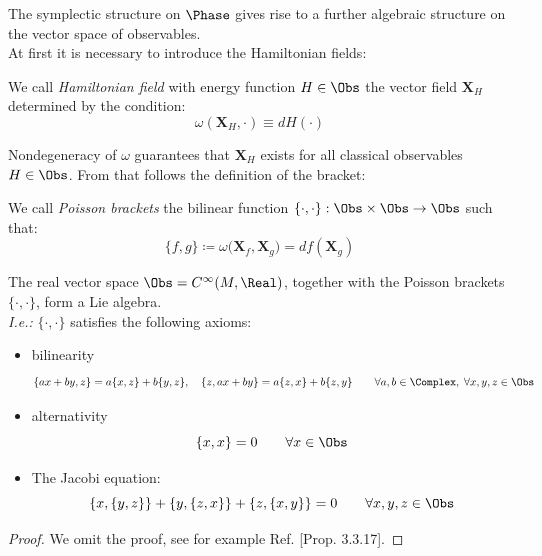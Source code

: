 \documentclass[Main]{subfiles}
\begin{document}
	\vspace{2mm}
	The symplectic structure on $\Phase$ gives rise to a further algebraic structure on the vector space of observables.\\
	At first it is necessary to introduce the Hamiltonian fields:
	\begin{definition}
		We call \emph{Hamiltonian field} with energy function $H\in \Obs$
		the vector field $\mathbf{X}_H$ determined by the condition:
		\begin{displaymath}
			\omega( \mathbf{X}_H,  \cdot )\equiv dH (\cdot)
		\end{displaymath}
	\end{definition}
	Nondegeneracy of $\omega$ guarantees that $\mathbf{X}_H$ exists for all classical observables $H\in \Obs$.
	From that follows the definition of the bracket:
	\begin{definition}
		We call \emph{Poisson brackets}
		the bilinear function 	$\{\cdot, \cdot\} : \Obs \times \Obs \rightarrow \Obs$ such that:
		\begin{equation}
			\{ f, g \} \coloneqq \omega \big( \mathbf{X}_f , \mathbf{X}_g \big) = df ( \mathbf{X}_g)
		\end{equation}
	\end{definition}
	\begin{proposition}
		The real vector space $\Obs= C^\infty(M,\Real)$, together with the Poisson brackets $\{\cdot, \cdot\}$, form a Lie algebra.\\
		\textit{I.e.:} $\{\cdot,\cdot\}$ satisfies  the following axioms:
		\begin{itemize}
			\item bilinearity
				\begin{displaymath}
					\{a x + b y, z\} = a \{x, z\} + b \{y, z\}, \quad  \{z, a x + b y\} = a\{z, x\}+ b \{z, y\} \qquad \forall a,b \in \Complex , \; \forall x,y,z \in \Obs
				\end{displaymath}
			\item alternativity
				\begin{displaymath}
						\{x,x\}= 0 \qquad \forall x \in \Obs
				\end{displaymath}
			\item The Jacobi equation:
				\begin{displaymath}
					\{x, \{ y , z \} \} + \{y, \{ z , x \} \} + \{z, \{ x , y \} \} = 0 \qquad \forall x,y,z \in \Obs
				\end{displaymath}
		\end{itemize}
	\end{proposition}
	\begin{proof}
		We omit the proof, see for example Ref. \cite{Abraham1978}[Prop. 3.3.17].
	\end{proof}
	
\end{document}
